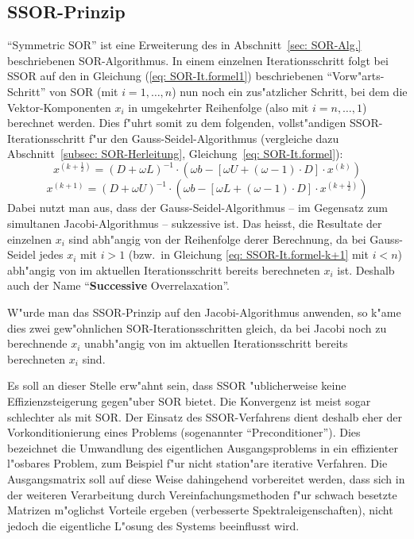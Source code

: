 \begin{refsection}
\section{SSOR-Prinzip}
``Symmetric SOR'' ist eine Erweiterung des in Abschnitt~\ref{sec: SOR-Alg.}
beschriebenen SOR-Algorithmus. In einem einzelnen Iterationsschritt
folgt bei SSOR auf den in Gleichung (\ref{eq: SOR-It.formel1})
beschriebenen ``Vorw"arts-Schritt'' von SOR (mit $i=1,\dots,n$) nun
noch ein zus"atzlicher Schritt, bei dem die Vektor-Kompo\-nenten $x_i$ in
umgekehrter Reihenfolge (also mit $i=n,\dots, 1$) berechnet werden. Dies
f"uhrt somit zu dem folgenden, vollst"andigen SSOR-Iterationsschritt
f"ur den Gauss-Seidel-Algorithmus (vergleiche dazu Abschnitt~\ref{subsec:
SOR-Herleitung}, Gleichung~\ref{eq: SOR-It.formel}):
\begin{equation} \label{eq: SSOR-It.formel-k+1/2}
	x^{(k+\frac{1}{2})}=(D+\omega L)^{-1}\cdot(\omega b-[\omega U+(\omega-1)\cdot D]\cdot x^{(k)})
\end{equation}
\begin{equation} \label{eq: SSOR-It.formel-k+1}
	x^{(k+1)}=(D+\omega U)^{-1}\cdot(\omega b-[\omega L+(\omega-1)\cdot D]\cdot x^{(k+\frac{1}{2})})
\end{equation}
Dabei nutzt man aus, dass der Gauss-Seidel-Algorithmus -- im Gegensatz
zum simultanen Jacobi-Algorithmus -- sukzessive ist. Das heisst, die
Resultate der einzelnen $x_i$ sind abh"angig von der Reihenfolge derer
Berechnung, da bei Gauss-Seidel jedes $x_i$ mit $i>1$ (bzw.~in Gleichung
\ref{eq: SSOR-It.formel-k+1} mit $i<n$) abh"angig von im aktuellen
Iterationsschritt bereits berechneten $x_i$ ist. Deshalb auch der Name
``\textbf{Successive} Overrelaxation''.


W"urde man das SSOR-Prinzip auf den Jacobi-Algorithmus anwenden, so k"ame
dies zwei gew"ohnlichen SOR-Iterationsschritten gleich, da bei Jacobi
noch zu berechnende $x_i$ unabh"angig von im aktuellen Iterationsschritt
bereits berechneten $x_i$ sind.

Es soll an dieser Stelle erw"ahnt sein, dass SSOR "ublicherweise keine
Effizienzsteigerung gegen"uber SOR bietet. Die Konvergenz ist meist sogar
schlechter als mit SOR. Der Einsatz des SSOR-Verfahrens dient deshalb
eher der Vorkonditionierung \cite{Vorkonditionierung_Dorn} eines Problems
(sogenannter ``Preconditioner''). Dies bezeichnet die Umwandlung des
eigentlichen Ausgangsproblems in ein effizienter l"osbares Problem, zum
Beispiel f"ur nicht station"are iterative Verfahren. Die Ausgangsmatrix
soll auf diese Weise dahingehend vorbereitet werden, dass sich in der
weiteren Verarbeitung durch Vereinfachungsmethoden f"ur schwach besetzte
Matrizen m"oglichst Vorteile ergeben (verbesserte Spektraleigenschaften),
nicht jedoch die eigentliche L"osung des Systems beeinflusst wird.


\end{refsection}
